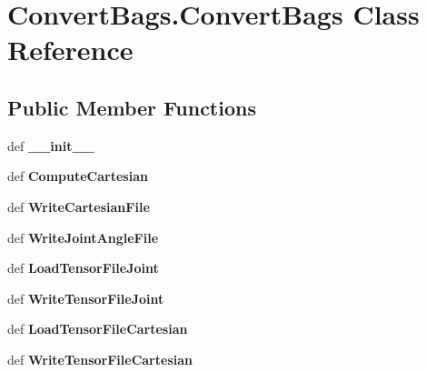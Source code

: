 \hypertarget{classConvertBags_1_1ConvertBags}{\section{Convert\-Bags.\-Convert\-Bags Class Reference}
\label{classConvertBags_1_1ConvertBags}
}
\subsection*{Public Member Functions}
\begin{DoxyCompactItemize}
\item 
\hypertarget{classConvertBags_1_1ConvertBags_a501d26adbcd8cdea5f39a4399b2028f2}{def {\bfseries \-\_\-\-\_\-init\-\_\-\-\_\-}}\label{classConvertBags_1_1ConvertBags_a501d26adbcd8cdea5f39a4399b2028f2}

\item 
\hypertarget{classConvertBags_1_1ConvertBags_a4e6bbda8fc44d575a34df751b9dd4023}{def {\bfseries Compute\-Cartesian}}\label{classConvertBags_1_1ConvertBags_a4e6bbda8fc44d575a34df751b9dd4023}

\item 
\hypertarget{classConvertBags_1_1ConvertBags_a3fd1970eb9b643601f688f77b0932b4c}{def {\bfseries Write\-Cartesian\-File}}\label{classConvertBags_1_1ConvertBags_a3fd1970eb9b643601f688f77b0932b4c}

\item 
\hypertarget{classConvertBags_1_1ConvertBags_a81e4fdd510e7ce2fcaa1631e607e5c2a}{def {\bfseries Write\-Joint\-Angle\-File}}\label{classConvertBags_1_1ConvertBags_a81e4fdd510e7ce2fcaa1631e607e5c2a}

\item 
\hypertarget{classConvertBags_1_1ConvertBags_a94eda7e24673f6c5c7fff44e7a0d05f4}{def {\bfseries Load\-Tensor\-File\-Joint}}\label{classConvertBags_1_1ConvertBags_a94eda7e24673f6c5c7fff44e7a0d05f4}

\item 
\hypertarget{classConvertBags_1_1ConvertBags_a460e1b42816e88abaf7db6f8bb67ef8a}{def {\bfseries Write\-Tensor\-File\-Joint}}\label{classConvertBags_1_1ConvertBags_a460e1b42816e88abaf7db6f8bb67ef8a}

\item 
\hypertarget{classConvertBags_1_1ConvertBags_a214b012176f1d04e100d3ef26288a32b}{def {\bfseries Load\-Tensor\-File\-Cartesian}}\label{classConvertBags_1_1ConvertBags_a214b012176f1d04e100d3ef26288a32b}

\item 
\hypertarget{classConvertBags_1_1ConvertBags_a9e1872614576da67f0cc82803c3a1295}{def {\bfseries Write\-Tensor\-File\-Cartesian}}\label{classConvertBags_1_1ConvertBags_a9e1872614576da67f0cc82803c3a1295}

\end{DoxyCompactItemize}
